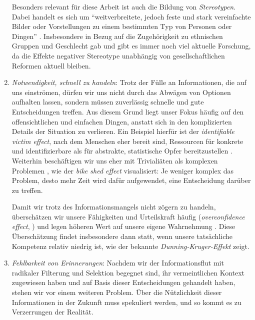 \begin{enumerate}
	Besonders relevant für diese Arbeit ist auch die Bildung von \emph{Stereotypen}.
	Dabei handelt es sich um ``weitverbreitete, jedoch feste und stark vereinfachte Bilder oder Vorstellungen zu einem bestimmten Typ von Personen oder Dingen'' \citep[Übers. d. Verf.]{bordalo2016stereotypes}. %
	Insbesondere in Bezug auf die Zugehörigkeit zu ethnischen Gruppen \citep{brigham1971ethnic, guichard1977ethnic, mastro2009effects} und Geschlecht \citep{hoffman1990gender, heilman2012gender, haines2016times, ellemers2018gender} gab und gibt es immer noch viel aktuelle Forschung, da die Effekte negativer Stereotype unabhängig von gesellschaftlichen Reformen aktuell bleiben.
	
	\item \emph{Notwendigkeit, schnell zu handeln}: Trotz der Fülle an Informationen, die auf uns einströmen, dürfen wir uns nicht durch das Abwägen von Optionen aufhalten lassen, sondern müssen zuverlässig schnelle und gute Entscheidungen treffen.
	Aus diesem Grund liegt unser Fokus häufig auf den offensichtlichen und einfachen Dingen, anstatt sich in den komplizierten Details der Situation zu verlieren.
	Ein Beispiel hierfür ist der \emph{identifiable victim effect}, nach dem Menschen eher bereit sind, Ressourcen für konkrete und identifizierbare als für abstrakte, statistische Opfer bereitzustellen \citep{jenni1997explaining}.
	Weiterhin beschäftigen wir uns eher mit Trivialiäten als komplexen Problemen \citep{parkinson1958parkinson}, wie der \emph{bike shed effect} visualisiert:
	Je weniger komplex das Problem, desto mehr Zeit wird dafür aufgewendet, eine Entscheidung darüber zu treffen.
	
	Damit wir trotz des Informationsmangels nicht zögern zu handeln, überschätzen wir unsere Fähigkeiten und Urteilskraft häufig (\emph{overconfidence effect}, \cite{moore2008trouble}) und legen höheren Wert auf unsere eigene Wahrnehmung \citep{ross1979egocentric}.
	Diese Überschätzung findet insbesondere dann statt, wenn unsere tatsächliche Kompetenz relativ niedrig ist, wie der bekannte \emph{Dunning-Kruger-Effekt} \citep{dunning2011dunning} zeigt.
	
	\item \emph{Fehlbarkeit von Erinnerungen}: Nachdem wir der Informationsflut mit radikaler Filterung und Selektion begegnet sind, ihr vermeintlichen Kontext zugewiesen haben und auf Basis dieser Entscheidungen gehandelt haben, stehen wir vor einem weiteren Problem.
	Über die Nützlichkeit dieser Informationen in der Zukunft muss spekuliert werden, und so kommt es zu Verzerrungen der Realität.
\end{enumerate}


